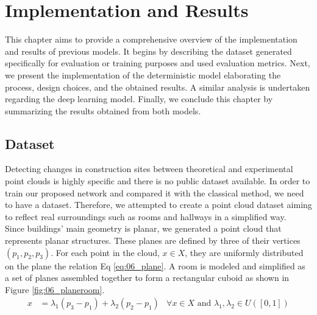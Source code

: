 \chapter{Implementation and Results}
This chapter aims to provide a comprehensive overview of the implementation and results of previous models. It begins by describing the dataset generated specifically for evaluation or training purposes and used evaluation metrics. Next, we present the implementation of the deterministic model elaborating the process, design choices, and the obtained results. A similar analysis is undertaken regarding the deep learning model. Finally, we conclude this chapter by summarizing the results obtained from both models.

\section{Dataset}
Detecting changes in construction sites between theoretical and experimental point clouds is highly specific and there is no public dataset available. In order to train our proposed network and compared it with the classical method, we need to have a dataset. Therefore, we attempted to create a point cloud dataset aiming to reflect real surroundings such as rooms and hallways in a simplified way.\\

Since buildings' main geometry is planar, we generated a point cloud that represents planar structures. These planes are defined by three of their vertices $(p_1,p_2,p_3)$. For each point in the cloud, $x \in X$, they are uniformly distributed on the plane the relation Eq \ref{eq:06_plane}. A room is modeled and simplified as a set of planes assembled together to form a rectangular cuboid as shown in Figure \ref{fig:06_planeroom}.\\
\begin{align}
    x &= \lambda_1 (p_3-p_1) + \lambda_2 (p_2-p_1) &\forall x \in X \text{  and } \lambda_1, \lambda_2 \in U([0,1])
    \label{eq:06_plane}
\end{align}

